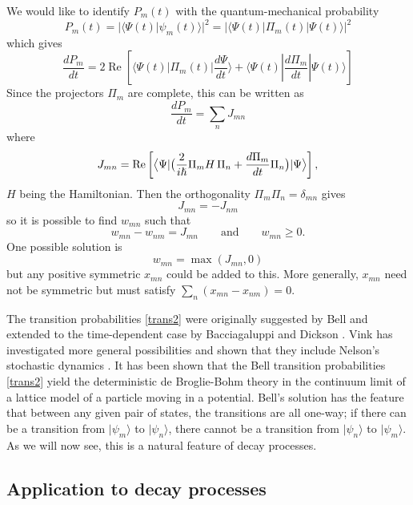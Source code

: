 \documentclass[12pt,a4paper,reqno]{article}
\renewcommand{\(}{\left(}
\renewcommand{\)}{\right)}
\renewcommand{\hbar}{\hslash}
\newcommand{\<}{\langle}
\renewcommand{\>}{\rangle}
\renewcommand{\Re}{\operatorname{Re}}
\theoremstyle{plain} %
\theoremstyle{definition}
\theoremstyle{remark}
\begin{document}
We would like to identify $P_m(t)$ with the quantum-mechanical probability
\begin{equation}\label{qmprob}
P_m(t) = |\<\Psi(t)|\psi_m(t)\>|^2
= \left|\<\Psi(t)|\Pi_m(t)|\Psi(t)\>\right|^2
\end{equation}
which gives
\[
\frac{dP_m}{dt} = 2\Re \left[\<\Psi(t)|\Pi_m(t)|\frac{d\Psi}{dt}\> +
\<\Psi(t)|\frac{d\Pi_m}{dt}|\Psi(t)\>\right]
\]
Since the projectors $\Pi_m$ are complete, this can be written as 
\[
\frac{dP_m}{dt} = \sum_n J_{mn}
\]
where
\begin{equation}\label{trans1}
J_{mn} = \Re \left [ \bigl\<\Psi|\bigl( { 2 \over i \hbar} \Pi_mH\,\Pi_n +
\frac{d\Pi_m}{dt}\Pi_n \bigr)|\Psi \bigr\> \right ],
\end{equation}
$H$ being the Hamiltonian. Then the orthogonality $\Pi_m\Pi_n = \delta_{mn}$ gives
\[
J_{mn} = -J_{nm}
\]
so it is possible to find $w_{mn}$ such that 
\[
w_{mn} - w_{nm} = J_{mn} \qquad \text{and} \qquad w_{mn} \ge 0.
\]
One possible solution is
\begin{equation}\label{trans2}
w_{mn} = \max (J_{mn}, 0)
\end{equation}
but any positive symmetric $x_{mn}$ could be added to this. More
generally, $x_{mn}$ need not be symmetric but must satisfy
$\sum_n(x_{mn} - x_{nm}) = 0$.

The transition probabilities \eqref{trans2} were originally suggested by
Bell \cite{Bell:beables} and extended to
the time-dependent case by Bacciagaluppi and Dickson
\cite{BacciaDickson}. Vink \cite{Vink}
has investigated more general possibilities and shown that they include
Nelson's stochastic dynamics \cite{Nelson:book}. It has been shown 
\cite{determlimit} that the Bell transition probabilities \eqref{trans2}
yield the deterministic de Broglie-Bohm theory in the continuum limit of
a lattice model of a particle moving in a potential. Bell's solution has
the feature that between any given pair of states, the transitions are
all one-way; if there can be a transition from $|\psi_m\>$ to
$|\psi_n\>$, there cannot be a transition from $|\psi_n\>$ to
$|\psi_m\>$. As we will now see, this is a natural feature of decay
processes.


\subsection{Application to decay processes}
\end{document}
